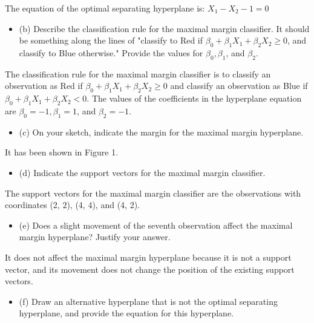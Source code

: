 \documentclass[11pt]{article}
\begin{document}
	
	The equation of the optimal separating hyperplane is: $X_{1}-X_{2}-1=0$
	
	\begin{itemize}
		\item (b) Describe the classification rule for the maximal margin classifier. It should be something along the lines of "classify to Red if $\beta_{0}+\beta_{1} X_{1}+\beta_{2} X_{2} \geq 0$, and classify to Blue otherwise." Provide the values for $\beta_{0}, \beta_{1}$, and $\beta_{2}$.
	\end{itemize}
	
	The classification rule for the maximal margin classifier is to classify an observation as Red if $\beta_{0}+\beta_{1} X_{1}+\beta_{2} X_{2} \geq 0$ and classify an observation as Blue if $\beta_{0}+\beta_{1} X_{1}+\beta_{2} X_{2}<0$. The values of the coefficients in the hyperplane equation are $\beta_{0}=-1, \beta_{1}=1$, and $\beta_{2}=-1$.
	
	\begin{itemize}
		\item (c) On your sketch, indicate the margin for the maximal margin hyperplane.
	\end{itemize}
	
	It has been shown in Figure 1.
	
	\begin{itemize}
		\item (d) Indicate the support vectors for the maximal margin classifier.
	\end{itemize}
	
	The support vectors for the maximal margin classifier are the observations with coordinates (2, $2$), (4, 4), and (4, 2).
	
	\begin{itemize}
		\item (e) Does a slight movement of the seventh observation affect the maximal margin hyperplane? Justify your answer.
	\end{itemize}
	
	It does not affect the maximal margin hyperplane because it is not a support vector, and its movement does not change the position of the existing support vectors.
	
	\begin{itemize}
		\item (f) Draw an alternative hyperplane that is not the optimal separating hyperplane, and provide the equation for this hyperplane.
	\end{itemize}
	
\end{document}
